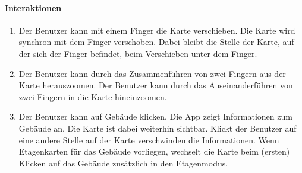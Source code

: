 \paragraph{Interaktionen}
\begin{enumerate}[start=11, label=\textbf{/FA\arabic*/}, align=left]
    \item Der Benutzer kann mit einem Finger die Karte verschieben. Die Karte wird synchron mit dem Finger verschoben. Dabei bleibt die Stelle der Karte, auf der sich der Finger befindet, beim Verschieben unter dem Finger.
    \item Der Benutzer kann durch das Zusammenführen von zwei Fingern aus der Karte herauszoomen. Der Benutzer kann durch das Auseinanderführen von zwei Fingern in die Karte hineinzoomen.
    \item Der Benutzer kann auf Gebäude klicken. Die App zeigt Informationen zum Gebäude an. Die Karte ist dabei weiterhin sichtbar. Klickt der Benutzer auf eine andere Stelle auf der Karte verschwinden die Informationen. Wenn Etagenkarten für das Gebäude vorliegen, wechselt die Karte beim (ersten) Klicken auf das Gebäude zusätzlich in den Etagenmodus.
\end{enumerate}